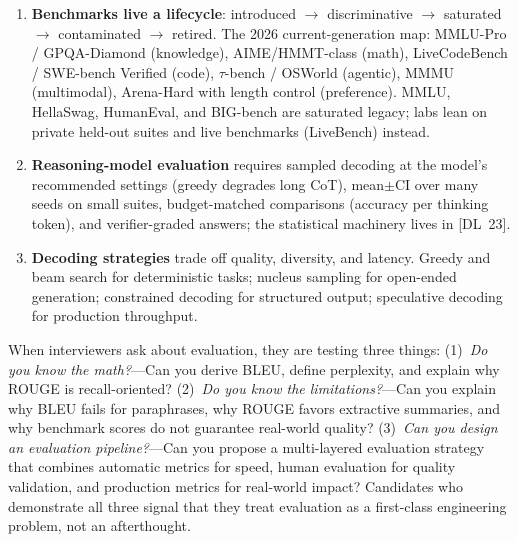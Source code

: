 \begin{enumerate}
    \item \textbf{Benchmarks live a lifecycle}: introduced $\to$
          discriminative $\to$ saturated $\to$ contaminated $\to$ retired.
          The 2026 current-generation map: MMLU-Pro / GPQA-Diamond
          (knowledge), AIME/HMMT-class (math), LiveCodeBench / SWE-bench
          Verified (code), $\tau$-bench / OSWorld (agentic), MMMU
          (multimodal), Arena-Hard with length control (preference).  MMLU,
          HellaSwag, HumanEval, and BIG-bench are saturated legacy; labs
          lean on private held-out suites and live benchmarks (LiveBench)
          instead.

    \item \textbf{Reasoning-model evaluation} requires sampled decoding at
          the model's recommended settings (greedy degrades long CoT),
          mean$\pm$CI over many seeds on small suites, budget-matched
          comparisons (accuracy per thinking token), and verifier-graded
          answers; the statistical machinery lives in [DL~23].

    \item \textbf{Decoding strategies} trade off quality, diversity, and latency.
          Greedy and beam search for deterministic tasks; nucleus sampling for
          open-ended generation; constrained decoding for structured output;
          speculative decoding for production throughput.
\end{enumerate}

\begin{keyinsight}
When interviewers ask about evaluation, they are testing three things:
(1)~\emph{Do you know the math?}---Can you derive BLEU, define perplexity,
and explain why ROUGE is recall-oriented?
(2)~\emph{Do you know the limitations?}---Can you explain why BLEU fails for
paraphrases, why ROUGE favors extractive summaries, and why benchmark scores
do not guarantee real-world quality?
(3)~\emph{Can you design an evaluation pipeline?}---Can you propose a
multi-layered evaluation strategy that combines automatic metrics for speed,
human evaluation for quality validation, and production metrics for real-world
impact?  Candidates who demonstrate all three signal that they treat evaluation
as a first-class engineering problem, not an afterthought.
\end{keyinsight}
